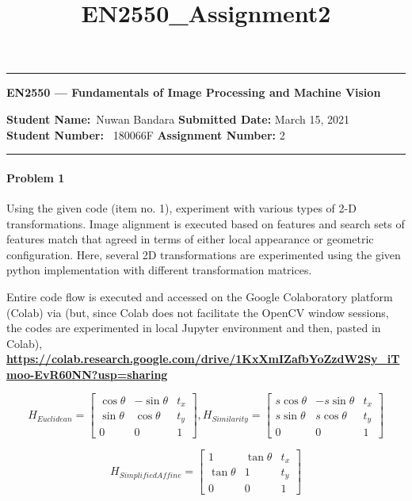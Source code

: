 \documentclass[11pt]{scrartcl}
\title{EN2550_Assignment2}
\begin{document}
\begin{center}
	\hrule
	\vspace{.4cm}
	{\textbf { \large EN2550 --- Fundamentals of Image Processing and Machine Vision}}
\end{center}
{\textbf{Student Name:}\ Nuwan Bandara \hspace{\fill} \textbf{Submitted Date:} March 15, 2021   \\
{ \textbf{Student Number:}} \ 180066F \hspace{\fill} \textbf{Assignment Number:} 2 \\
	\hrule


\paragraph*{Problem 1} %
Using the given code (item no. 1), experiment with various types of 2-D transformations. \newline
Image alignment is executed based on features and search sets of features match that agreed in terms of either local appearance or geometric configuration. Here, several 2D transformations are experimented using the given python implementation with different transformation matrices.

Entire code flow is executed and accessed on the Google Colaboratory platform (Colab) via (but, since Colab does not facilitate the OpenCV window sessions, the codes are experimented in local Jupyter environment and then, pasted in Colab), \\ 
\textbf{\url{https://colab.research.google.com/drive/1KxXmIZafbYoZzdW2Sy_iTmoo-EvR60NN?usp=sharing}}

\begin{equation}
H_{Euclidean} = 
\begin{bmatrix}
\cos{\theta} & -\sin{\theta} & t_x\\
\sin{\theta} & \cos{\theta} & t_y\\
0 & 0 & 1
\end{bmatrix}, H_{Similarity}=
\begin{bmatrix}
s\cos{\theta} & -s\sin{\theta} & t_x\\
s\sin{\theta} & s\cos{\theta} & t_y\\
0 & 0 & 1
\end{bmatrix}
\end{equation}

\begin{equation}
    H_{Simplified Affine}=
\begin{bmatrix}
1 & \tan{\theta} & t_x\\
\tan{\theta} & 1 & t_y\\
0 & 0 & 1
\end{bmatrix}
\end{equation}

}
\end{document}
